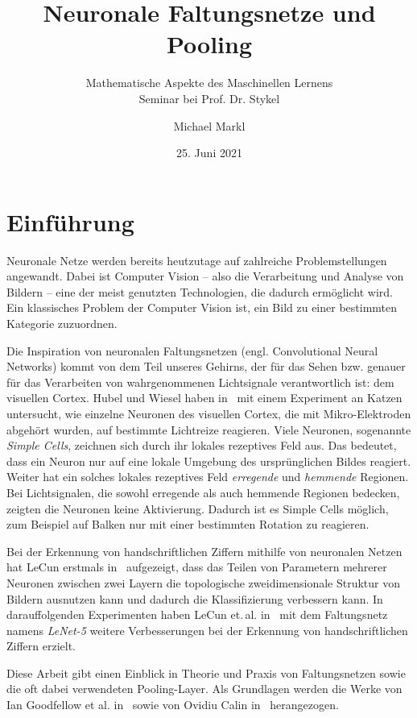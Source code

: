 \documentclass[paper=a4, 	%
		fontsize=11pt,
		abstract=true, 	%
		headsepline, 	%
		notitlepage	%
		]{scrartcl}
\title{Neuronale Faltungsnetze und Pooling}
\author{Michael Markl}
\date{25. Juni 2021}
\subtitle{Mathematische Aspekte des Maschinellen Lernens\\ Seminar bei Prof. Dr. Stykel}
\theoremstyle{definition}
\begin{document}
\maketitle


\section{Einführung}

Neuronale Netze werden bereits heutzutage auf zahlreiche Problemstellungen angewandt.
Dabei ist Computer Vision -- also die Verarbeitung und Analyse von Bildern -- eine der meist genutzten Technologien, die dadurch ermöglicht wird.
Ein klassisches Problem der Computer Vision ist, ein Bild zu einer bestimmten Kategorie zuzuordnen.

Die Inspiration von neuronalen Faltungsnetzen (engl. \foreignlanguage{english}{Convolutional Neural Networks}) kommt von dem Teil unseres Gehirns, der für das Sehen bzw. genauer für das Verarbeiten von wahrgenommenen Lichtsignale verantwortlich ist: dem visuellen Cortex.
Hubel und Wiesel haben in~\cite{Hubel1959,Hubel1962} mit einem Experiment an Katzen untersucht, wie einzelne Neuronen des visuellen Cortex, die mit Mikro-Elektroden abgehört wurden, auf bestimmte Lichtreize reagieren.
Viele Neuronen, sogenannte \emph{\foreignlanguage{english}{Simple Cells}}, zeichnen sich durch ihr lokales rezeptives Feld aus.
Das bedeutet, dass ein Neuron nur auf eine lokale Umgebung des ursprünglichen Bildes reagiert.
Weiter hat ein solches lokales rezeptives Feld \emph{erregende} und \emph{hemmende} Regionen.
Bei Lichtsignalen, die sowohl erregende als auch hemmende Regionen bedecken, zeigten die Neuronen keine Aktivierung.
Dadurch ist es \foreignlanguage{english}{Simple Cells} möglich, zum Beispiel auf Balken nur mit einer bestimmten Rotation zu reagieren.


Bei der Erkennung von handschriftlichen Ziffern mithilfe von neuronalen Netzen hat LeCun erstmals in~\cite{LeCun1989} aufgezeigt, dass das Teilen von Parametern mehrerer Neuronen zwischen zwei Layern die topologische zweidimensionale Struktur von Bildern ausnutzen kann und dadurch die Klassifizierung verbessern kann.
In darauffolgenden Experimenten haben LeCun et.\,al. in~\cite{lecun1998} mit dem Faltungsnetz namens \emph{LeNet-5} weitere Verbesserungen bei der Erkennung von handschriftlichen Ziffern erzielt.

Diese Arbeit gibt einen Einblick in Theorie und Praxis von Faltungsnetzen sowie die oft dabei verwendeten Pooling-Layer.
Als Grundlagen werden die Werke von Ian Goodfellow et al. in~\cite[Kapitel~9]{Goodfellow-et-al-2016} sowie von Ovidiu Calin in~\cite[Kapitel~15,16]{Calin2020} herangezogen.
\end{document}
